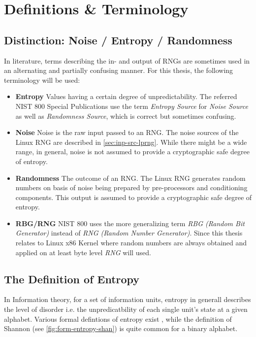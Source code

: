 \section{Definitions \& Terminology}

\subsection{Distinction: Noise / Entropy / Randomness}
In literature, terms describing the in- and output of RNGs are sometimes used in an alternating and partially confusing manner. For this thesis, the following terminology will be used:

\begin{itemize}
	\item \textbf{Entropy} Values having a certain degree of unpredictability. The referred NIST 800 Special Publications use the term \textit{Entropy Source} for \textit{Noise Source} as well as \textit{Randomness Source}, which is correct but sometimes confusing.
	\item \textbf{Noise} Noise is the raw input passed to an RNG. The noise sources of the Linux RNG are described in \ref{sec:inp-src-lprng}. While there might be a wide range, in general, noise is not assumed to provide a cryptographic safe degree of entropy. 
	\item \textbf{Randomness} The outcome of an RNG. The Linux RNG generates random numbers on basis of noise being prepared by pre-processors and conditioning components. This output is assumed to provide a cryptographic safe degree of entropy.  
	\item \textbf{RBG/RNG} NIST 800 uses the more generalizing term \textit{RBG (Random Bit Generator)} instead of \textit{RNG (Random Number Generator)}. Since this thesis relates to Linux x86 Kernel where random numbers are always obtained and applied on at least byte level \textit{RNG} will used.
\end{itemize}

\subsection{The Definition of Entropy}
In Information theory, for a set of information units, entropy in generall describes the level of disorder i.e. the unpredicatbility of each single unit's state at a given alphabet. Various formal defintions of entropy exist \cite{hagerty2012entropy}, while the definition of Shannon (see \ref{fig:form-entropy-shan}) is quite common for a binary alphabet. 

